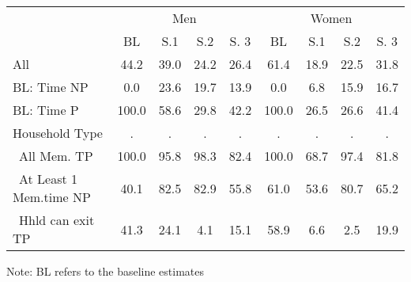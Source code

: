 \begin{tabular}{l*{8}{c}}
\hline\hline
          & \multicolumn{4}{c}{Men} & \multicolumn{4}{c}{Women} \\ 
\cline{2-5} \cline{6-9}
&          BL&         S.1&         S.2&        S. 3&          BL&         S.1&         S.2&        S. 3\\
\hline
All         &        44.2&        39.0&        24.2&        26.4&        61.4&        18.9&        22.5&        31.8\\
BL: Time NP &         0.0&        23.6&        19.7&        13.9&         0.0&         6.8&        15.9&        16.7\\
BL: Time P  &       100.0&        58.6&        29.8&        42.2&       100.0&        26.5&        26.6&        41.4\\
Household Type&           .&           .&           .&           .&           .&           .&           .&           .\\
\ All Mem. TP &       100.0&        95.8&        98.3&        82.4&       100.0&        68.7&        97.4&        81.8\\
\ At Least 1 Mem.time NP&        40.1&        82.5&        82.9&        55.8&        61.0&        53.6&        80.7&        65.2\\
\ Hhld can exit TP&        41.3&        24.1&         4.1&        15.1&        58.9&         6.6&         2.5&        19.9\\

\hline\hline
\end{tabular}
\footnotesize Note: BL refers to the baseline estimates
